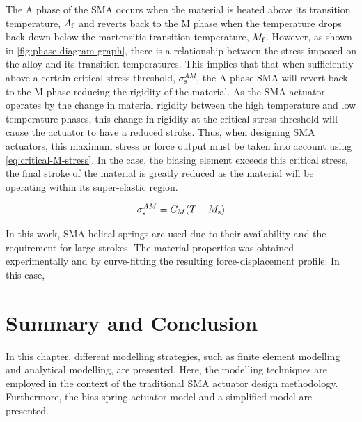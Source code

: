 The A phase of the SMA occurs when the material is heated above its transition temperature, $A_\mathrm{f}$ and reverts back to the M phase when the temperature drops back down below the martensitic transition temperature, $M_\mathrm{f}$. However, as shown in \cref{fig:phase-diagram-graph}, there is a relationship between the stress imposed on the alloy and its transition temperatures. This implies that that when sufficiently above a certain critical stress threshold, $\sigma_\mathrm{s}^{AM}$, the A phase SMA will revert back to the M phase reducing the rigidity of the material. As the SMA actuator operates by the change in material rigidity between the high temperature and low temperature phases, this change in rigidity at the critical stress threshold will cause the actuator to have a reduced stroke. Thus, when designing SMA actuators, this maximum stress or force output must be taken into account using \cref{eq:critical-M-stress}. In the case, the biasing element exceeds this critical stress, the final stroke of the material is greatly reduced as the material will be operating within its super-elastic region.

\begin{equation}\label{eq:critical-M-stress}
    \sigma_\mathrm{s}^{AM} = C_M (T-M_\mathrm{s})
\end{equation}

In this work, SMA helical springs are used due to their availability and the requirement for large strokes. The material properties was obtained experimentally and by curve-fitting the resulting force-displacement profile. In this case, 

\section{Summary and Conclusion}
In this chapter, different modelling strategies, such as finite element modelling and analytical modelling, are presented. Here, the modelling techniques are employed in the context of the traditional SMA actuator design methodology. Furthermore, the bias spring actuator model and a simplified model are presented.
